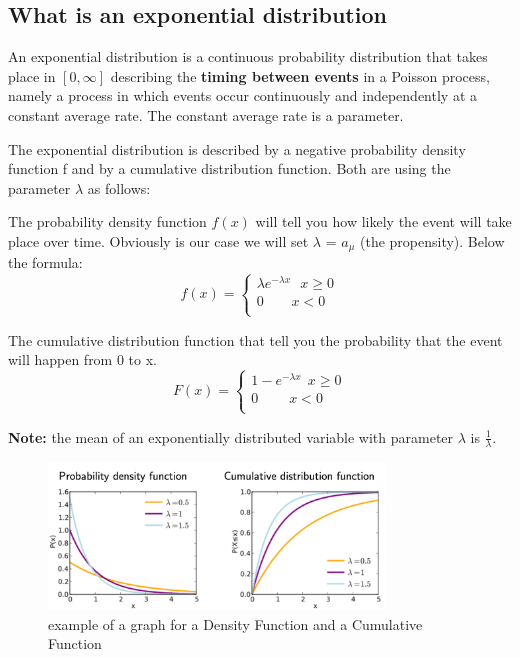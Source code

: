 \subsection{What is an exponential distribution}
An exponential distribution is a continuous probability distribution that takes place in $[0, \infty]$ describing the \textbf{timing between events} in a Poisson process, namely a process in which events occur continuously and independently at a constant average rate. The constant average rate is a parameter.\par

The exponential distribution is described by a negative probability density function f and by a cumulative distribution function. Both are using the parameter $\lambda$ as follows:

The probability density function $f(x)$ will tell you how likely the event will take place over time. Obviously is our case we will set $\lambda$ = $a_\mu$ (the propensity). Below the formula:
\[
f(x) =
\begin{cases}
        \lambda e^{- \lambda x} \ \ \ x \geq 0  \\
        0 \ \ \ \ \ \ \ \ \ x < 0\\
\end{cases}
\]

The cumulative distribution function that tell you the probability that the event will happen from 0 to x.
\[
F(x) =
\begin{cases}
        1 - e^{- \lambda x} \ \ x \geq 0  \\
        0 \ \ \ \ \ \ \ \ \ \ x < 0\\
\end{cases}
\]

\textbf{Note:} the mean of an exponentially distributed variable with parameter $\lambda$ is $\frac{1}{\lambda}$.

\begin{figure}[h]
    \centering
    \includegraphics[width=0.8\textwidth]{Images/06 - Stochastic Simulation of Chemical Reactions/Graphs_Density_Cumulative.png}
    \caption{example of a graph for a Density Function and a Cumulative Function} 
\end{figure}


